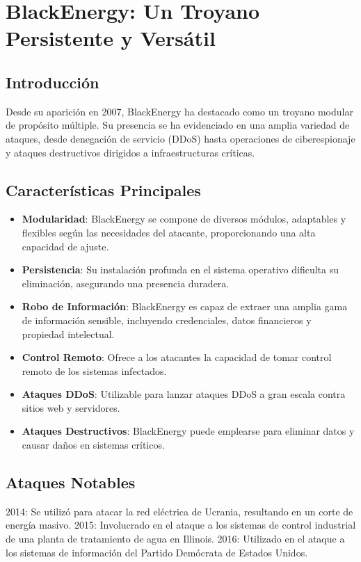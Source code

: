 \section{BlackEnergy: Un Troyano Persistente y Versátil}
\subsection{Introducción}
Desde su aparición en 2007, BlackEnergy ha destacado como un troyano modular de propósito múltiple. Su presencia se ha evidenciado en una amplia variedad de ataques, desde denegación de servicio (DDoS) hasta operaciones de ciberespionaje y ataques destructivos dirigidos a infraestructuras críticas.
\subsection{Características Principales}
\begin{itemize}
    \item \textbf{Modularidad}: BlackEnergy se compone de diversos módulos, adaptables y flexibles según las necesidades del atacante, proporcionando una alta capacidad de ajuste.
    
    \item \textbf{Persistencia}: Su instalación profunda en el sistema operativo dificulta su eliminación, asegurando una presencia duradera.
    
    \item \textbf{Robo de Información}: BlackEnergy es capaz de extraer una amplia gama de información sensible, incluyendo credenciales, datos financieros y propiedad intelectual.
    
    \item \textbf{Control Remoto}: Ofrece a los atacantes la capacidad de tomar control remoto de los sistemas infectados.
    
    \item \textbf{Ataques DDoS}: Utilizable para lanzar ataques DDoS a gran escala contra sitios web y servidores.
    
    \item \textbf{Ataques Destructivos}: BlackEnergy puede emplearse para eliminar datos y causar daños en sistemas críticos.
\end{itemize}
\subsection{Ataques Notables}
2014: Se utilizó para atacar la red eléctrica de Ucrania, resultando en un corte de energía masivo.
2015: Involucrado en el ataque a los sistemas de control industrial de una planta de tratamiento de agua en Illinois.
2016: Utilizado en el ataque a los sistemas de información del Partido Demócrata de Estados Unidos.
